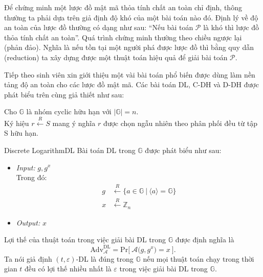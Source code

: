 \documentclass[class=report, crop=false]{standalone}
\begin{document}
		Để chứng minh một lược đồ mật mã thỏa tính chất an toàn chỉ định, thông thường ta phải dựa trên giả định độ khó của một bài toán nào đó. Định lý về độ an toàn của lược đồ thường có dạng như sau: ``Nếu bài toán $\mathcal{P}$ là khó thì lược đồ thỏa tính chất an toàn''. Quá trình chứng minh thường theo chiều ngược lại (phản đảo). Nghĩa là nếu tồn tại một người phá được lược đồ thì bằng quy dẫn (reduction) ta xây dựng được một thuật toán hiệu quả để giải bài toán $\mathcal{P}$.
		
		Tiếp theo sinh viên xin giới thiệu một vài bài toán phổ biến được dùng làm nền tảng độ an toàn cho các lược đồ mật mã. Các bài toán DL, C-DH và D-DH được phát biểu trên cùng giả thiết như sau:

		Cho $\mathbb{G}$ là nhóm cyclic hữu hạn với $|\mathbb{G}| = n$. \\ \indent
		Ký hiệu \hspace{1ex} $r \xleftarrow{R} S$ \hspace{1ex} mang ý nghĩa $r$ được chọn ngẫu nhiên theo phân phối đều từ tập S hữu hạn.
		\begin{problem}{Discrete Logarithm}{DL}
			Bài toán DL trong $\mathbb{G}$ được phát biểu như sau:
			\vspace{-\baselineskip}
			\begin{itemize}[leftmargin=1.5cm, itemindent=-0.5cm]
				\item[] \textit{Input:} $g, g^x$ \\
				Trong đó: \vspace{-\baselineskip}
				\begin{align*}
					g &\xleftarrow{R} \{ a \in \mathbb{G}\ | \ \langle a \rangle = \mathbb{G} \} \\
					x &\xleftarrow{R} \mathbb{Z}_n
				\end{align*}
				\item[] \textit{Output:} $x$
			\end{itemize}
			\vspace{-\baselineskip}\par
			Lợi thế của thuật toán \algo trong việc giải bài DL trong $\mathbb{G}$ được định nghĩa là
			\[
				\text{Adv}_{\mathcal{A}}^{\text{DL}} = \text{Pr}\bigg[ \ \mathcal{A}\Big(g, g^x \Big) = x \ \bigg].
			\] \indent
			Ta nói giả định $(t, \varepsilon)$-DL là đúng trong $\mathbb{G}$ nếu mọi thuật toán chạy trong thời gian $t$ đều có lợi thế nhiều nhất là $\varepsilon$ trong việc giải bài DL trong $\mathbb{G}$.
		\end{problem}
\end{document}
